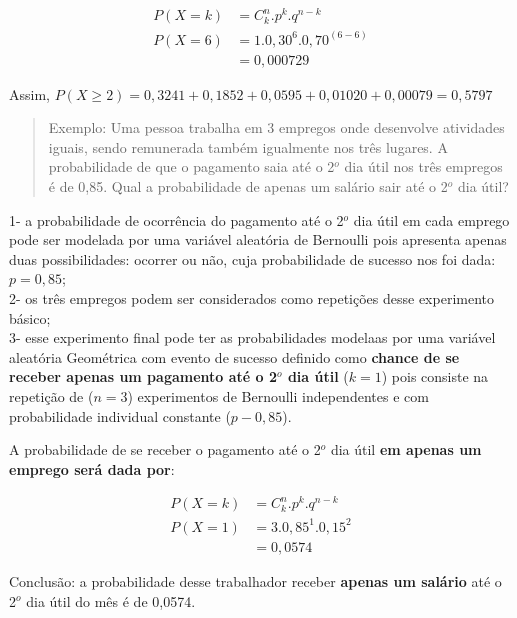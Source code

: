 \documentclass[
]{book}
\begin{document}
\hfill\break

\begin{align*}
P\left(X=k\right) & ={C}_{k}^{n}. {p}^{k}. {q}^{n-k} \\
P\left(X=6\right) & = 1 . 0,30^{6} . 0,70^{(6-6)} \\
                  & = 0,000729
\end{align*}

Assim, \(P\left(X\ge2\right)=0,3241+0,1852+0,0595+0,01020+0,00079=0,5797\)

\hfill\break

\begin{quote}
Exemplo: Uma pessoa trabalha em 3 empregos onde desenvolve atividades iguais, sendo remunerada também igualmente nos três lugares. A probabilidade de que o pagamento saia até o 2\(^{o}\) dia útil nos três empregos é de 0,85. Qual a probabilidade de apenas um salário sair até o 2\(^{o}\) dia útil?
\end{quote}

\hfill\break

1- a probabilidade de ocorrência do pagamento até o 2\(^{o}\) dia útil em cada emprego pode ser modelada por uma variável aleatória de Bernoulli pois apresenta apenas duas possibilidades: ocorrer ou não, cuja probabilidade de sucesso nos foi dada: \(p=0,85\);\\
2- os três empregos podem ser considerados como repetições desse experimento básico;\\
3- esse experimento final pode ter as probabilidades modelaas por uma variável aleatória Geométrica com evento de sucesso definido como \textbf{chance de se receber apenas um pagamento até o 2\(^{o}\) dia útil} (\(k=1\)) pois consiste na repetição de (\(n=3\)) experimentos de Bernoulli independentes e com probabilidade individual constante (\(p-0,85\)).

\hfill\break

A probabilidade de se receber o pagamento até o 2\(^{o}\) dia útil \textbf{em apenas um emprego será dada por}:

\hfill\break

\begin{align*}
P\left(X=k\right) & ={C}_{k}^{n}. {p}^{k}. {q}^{n-k} \\
P\left(X=1\right) & =3 . 0,85^{1} . 0,15^{2} \\
                  & = 0,0574
\end{align*}

\hfill\break

Conclusão: a probabilidade desse trabalhador receber \textbf{apenas um salário} até o 2\(^{o}\) dia útil do mês é de 0,0574.
\end{document}
